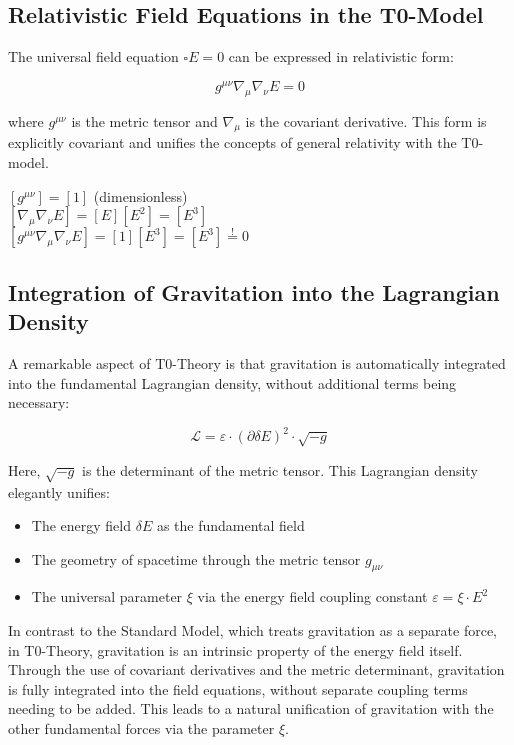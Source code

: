 \documentclass[12pt,a4paper]{article}
\newcommand{\dfield}{\delta E}
\theoremstyle{definition}
\begin{document}
	\subsection{Relativistic Field Equations in the T0-Model}
	
	The universal field equation $\square E = 0$ can be expressed in relativistic form:
	
	\begin{equation}
		\boxed{g^{\mu\nu}\nabla_\mu\nabla_\nu E = 0}
	\end{equation}
	
	where $g^{\mu\nu}$ is the metric tensor and $\nabla_\mu$ is the covariant derivative. This form is explicitly covariant and unifies the concepts of general relativity with the T0-model.
	
	\begin{einheitencheck}
		$[g^{\mu\nu}] = [1]$ (dimensionless)\\
		$[\nabla_\mu\nabla_\nu E] = [E][E^2] = [E^3]$\\
		$[g^{\mu\nu}\nabla_\mu\nabla_\nu E] = [1][E^3] = [E^3] \stackrel{!}{=} 0$ \checkmark
	\end{einheitencheck}
	
	\subsection{Integration of Gravitation into the Lagrangian Density}
	
	A remarkable aspect of T0-Theory is that gravitation is automatically integrated into the fundamental Lagrangian density, without additional terms being necessary:
	
	\begin{equation}
		\boxed{\mathcal{L} = \varepsilon \cdot (\partial\dfield)^2 \cdot \sqrt{-g}}
	\end{equation}
	
	Here, $\sqrt{-g}$ is the determinant of the metric tensor. This Lagrangian density elegantly unifies:
	\begin{itemize}
		\item The energy field $\dfield$ as the fundamental field
		\item The geometry of spacetime through the metric tensor $g_{\mu\nu}$
		\item The universal parameter $\xi$ via the energy field coupling constant $\varepsilon = \xi \cdot E^2$
	\end{itemize}
	
	\begin{wichtig}
		In contrast to the Standard Model, which treats gravitation as a separate force, in T0-Theory, gravitation is an intrinsic property of the energy field itself. Through the use of covariant derivatives and the metric determinant, gravitation is fully integrated into the field equations, without separate coupling terms needing to be added. This leads to a natural unification of gravitation with the other fundamental forces via the parameter $\xi$.
	\end{wichtig}
	
\end{document}
